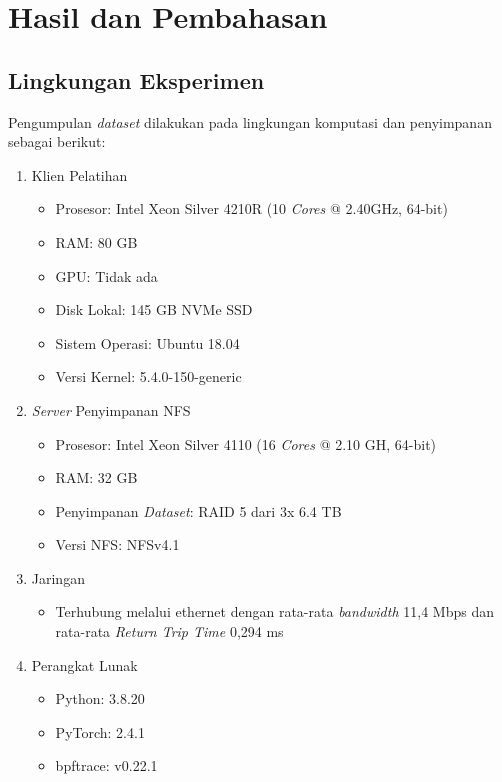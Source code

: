 \chapter{Hasil dan Pembahasan}

\section {Lingkungan Eksperimen}

Pengumpulan \textit{dataset} dilakukan pada lingkungan komputasi dan penyimpanan sebagai berikut:

\begin{enumerate}[label=\Alph{enumi}.,topsep=0pt,itemsep=0pt,parsep=0pt]
    \item Klien Pelatihan
        \begin{itemize}[itemsep=0pt, parsep=0pt]
            \item Prosesor: Intel Xeon Silver 4210R (10 \textit{Cores} @ 2.40GHz, 64-bit)
            \item RAM: 80 GB
            \item GPU: Tidak ada
            \item Disk Lokal: 145 GB NVMe SSD
            \item Sistem Operasi: Ubuntu 18.04
            \item Versi Kernel: 5.4.0-150-generic
        \end{itemize}

    \item \textit{Server} Penyimpanan NFS
        \begin{itemize}[itemsep=0pt, parsep=0pt]
            \item Prosesor: Intel Xeon Silver 4110 (16 \textit{Cores} @ 2.10 GH, 64-bit)
            \item RAM: 32 GB
            \item Penyimpanan \textit{Dataset}: RAID 5 dari 3x 6.4 TB
            \item Versi NFS: NFSv4.1
        \end{itemize}
    
    \item Jaringan
        \begin{itemize}[itemsep=0pt, parsep=0pt]
            \item Terhubung melalui ethernet dengan rata-rata \textit{bandwidth} 11,4 Mbps dan rata-rata \textit{Return Trip Time} 0,294 ms
        \end{itemize}

    \item Perangkat Lunak
        \begin{itemize}[itemsep=0pt, parsep=0pt]
            \item Python: 3.8.20
            \item PyTorch: 2.4.1
            \item bpftrace: v0.22.1
        \end{itemize}
\end{enumerate}

